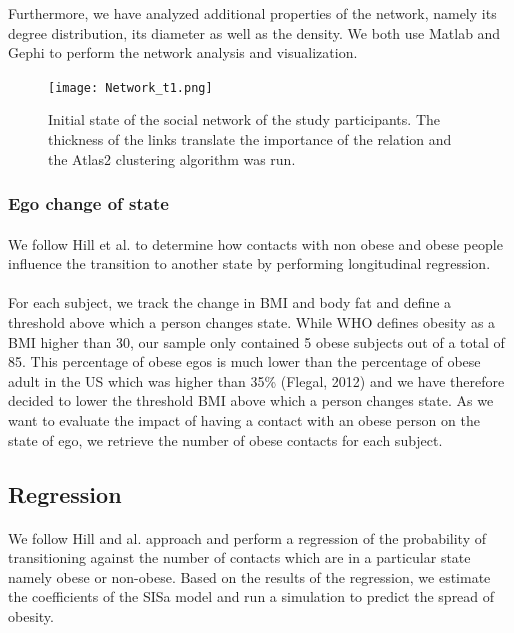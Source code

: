 \documentclass[11pt]{article}
\begin{document}
Furthermore, we have analyzed additional properties of the network, namely its degree distribution, its diameter as well as the density. We both use Matlab and Gephi to perform the network analysis and visualization.

\begin{figure}[!ht]
\center
   \texttt{[image: Network\_t1.png]}
   \caption{\label{4} Initial state of the social network of the study participants. The thickness of the links translate the importance of the relation and the Atlas2 clustering algorithm was run.}
\end{figure}

\subsubsection{Ego change of state}
\paragraph{}
We follow Hill et al. to determine how contacts with non obese and obese people influence the transition to another state by performing longitudinal regression. 
\paragraph{}
For each subject, we track the change in BMI and body fat and define a threshold above which a person changes state. While WHO defines obesity as a BMI higher than 30, our sample only contained 5 obese subjects out of a total of 85. This percentage of obese egos is much lower than the percentage of obese adult in the US which was higher than 35\% (Flegal, 2012) and we have therefore decided to lower the threshold BMI above which a person changes state. As we want to evaluate the impact of having a contact with an obese person  on the state of ego, we retrieve the number of obese contacts for each subject.

\subsection{Regression}
\paragraph{}
We follow Hill and al. approach and perform a regression of the probability of transitioning against the number of contacts which are in a particular state namely obese or non-obese. Based on the results of the regression, we estimate the coefficients of the SISa model and run a simulation to predict the spread of obesity.
\end{document}
